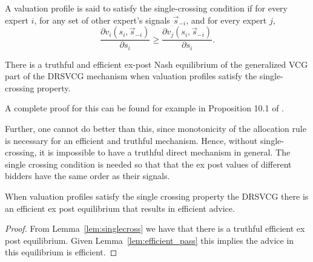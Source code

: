 \begin{defn}
	A valuation profile is said to satisfy the single-crossing condition if for every expert $i$, for any set of other expert's  signals $\vec{s}_{-i}$, and for every expert $j$, $$\frac{\partial v_i(s_i, \vec{s}_{-i})}{\partial s_i} \geq \frac{\partial v_j(s_i, \vec{s}_{-i})}{\partial s_i}.$$
\end{defn}


\begin{lem}\label{lem:singlecross}
	There is a truthful and efficient ex-post Nash equilibrium of the generalized VCG part of the DRSVCG mechanism when valuation profiles satisfy the single-crossing property.
\end{lem}


A complete proof for this can be found for example in Proposition 10.1 of \citet{krishna2009auction}.



Further, one cannot do better than this, since monotonicity of the allocation rule is necessary for an efficient and truthful mechanism. Hence, without single-crossing, it is impossible to have a truthful direct mechanism in general.
The single crossing condition is needed so that that the ex post values of different bidders have the same order as their signals.

\begin{thm}
    When valuation profiles satisfy the single crossing property the DRSVCG there is an efficient ex post equilibrium that results in efficient advice. 
\end{thm}

\begin{proof}
    From Lemma~\ref{lem:singlecross} we have that there is a truthful efficient ex post equilibrium. Given Lemma~\ref{lem:efficient_pass} this implies the advice in this equilibrium is efficient.
\end{proof}

